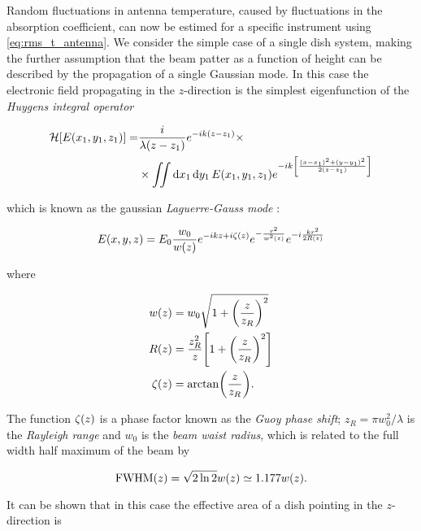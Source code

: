 Random fluctuations in antenna temperature, caused by fluctuations in the
absorption coefficient, can now be estimed for a specific instrument using
\autoref{eq:rms_t_antenna}. We consider the simple case of a single dish
system, making the further assumption that the beam patter as a function of
height can be described by the propagation of a single Gaussian mode.
In this case the electronic field propagating in the $z$-direction is the
simplest eigenfunction of the \emph{Huygens integral operator}
\autocite{belanger1991beam}

\begin{equation}
        \begin{split}
                \mathcal{H}\qty[E\qty(x_1,y_1,z_1)] = &
                \frac{i}{\lambda \qty(z - z_1)} e^{-ik\qty(z - z_1)} \times \\
                & \times \iint \dd{x_1}\dd{y_1} E\qty(x_1,y_1,z_1)
                e^{-ik\qty[\frac{\qty(x - x_1)^2 +
                \qty(y - y_1) ^2}{2\qty(z - z_1)}]}
        \end{split}
\end{equation}

which is known as the gaussian \emph{Laguerre-Gauss mode}
\autocite{alda2003laser}:

\begin{equation}
        E\qty(x,y,z) = E_0 \frac{w_0}{w\qty(z)} e^{-ikz + i\zeta\qty(z)}
        e^{-\frac{r^2}{w^2\qty(z)}} e^{-i\frac{kr^2}{2R\qty(z)}}
\end{equation}

where

\begin{align}
        w\qty(z) & = w_0 \sqrt{1 + \qty(\frac{z}{z_R})^2} \\
        R\qty(z) & = \frac{z^2_R}{z}\qty[1 + \qty(\frac{z}{z_R})^2] \\
        \zeta\qty(z) & = \arctan(\frac{z}{z_R}).
\end{align}

The function $\zeta\qty(z)$ is a phase factor known as the \emph{Guoy phase
shift}; $z_R = \pi w_0^2/\lambda$ is the \emph{Rayleigh range} and $w_0$ is
the \emph{beam waist radius}, which is related to the full width half
maximum of the beam by

\begin{equation}
        \text{FWHM}\qty(z) = \sqrt{2\ln 2} w\qty(z) \simeq 1.177 w\qty(z).
\end{equation}

It can be shown that in this case the effective area of a dish pointing in
the $z$-direction is \autocite{church1995predicting}

